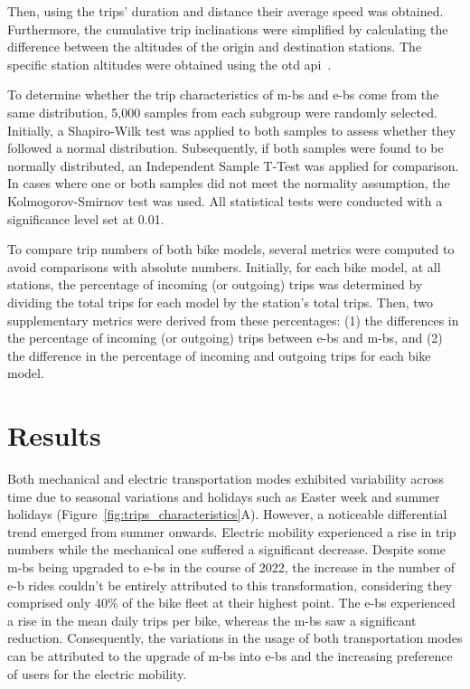     Then, using the trips' duration and distance their average speed was obtained. Furthermore, the cumulative trip inclinations were simplified by calculating the difference between the altitudes of the origin and destination stations. The specific station altitudes were obtained using the \ac{otd} \ac{api}~\cite{OpenTopoData_2023}.

    To determine whether the trip characteristics of \acp{m-b} and \acp{e-b} come from the same distribution, 5,000 samples from each subgroup were randomly selected. Initially, a Shapiro-Wilk test was applied to both samples to assess whether they followed a normal distribution. Subsequently, if both samples were found to be normally distributed, an Independent Sample T-Test was applied for comparison. In cases where one or both samples did not meet the normality assumption, the Kolmogorov-Smirnov test was used. All statistical tests were conducted with a significance level set at 0.01.

    To compare trip numbers of both bike models, several metrics were computed to avoid comparisons with absolute numbers. Initially, for each bike model, at all stations, the percentage of incoming (or outgoing) trips was determined by dividing the total trips for each model by the station's total trips. Then, two supplementary metrics were derived from these percentages: (1) the differences in the percentage of incoming (or outgoing) trips between \acp{e-b} and \acp{m-b}, and (2) the difference in the percentage of incoming and outgoing trips for each bike model.


\section{Results}

Both mechanical and electric transportation modes exhibited variability across time due to seasonal variations and holidays such as Easter week and summer holidays (Figure~\ref{fig:trips_characteristics}A). However, a noticeable differential trend emerged from summer onwards. Electric mobility experienced a rise in trip numbers while the mechanical one suffered a significant decrease. Despite some \acp{m-b} being upgraded to \acp{e-b} in the course of 2022, the increase in the number of \ac{e-b} rides couldn't be entirely attributed to this transformation, considering they comprised only 40\% of the bike fleet at their highest point. The \acp{e-b} experienced a rise in the mean daily trips per bike, whereas the \acp{m-b} saw a significant reduction. Consequently, the variations in the usage of both transportation modes can be attributed to the upgrade of \acp{m-b} into \acp{e-b} and the increasing preference of users for the electric mobility.


